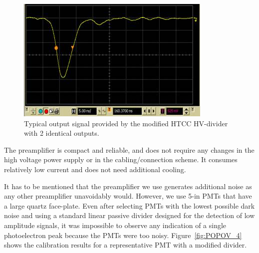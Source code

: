 \begin{figure}[!ht]
    \centering
    \includegraphics[width=1.0\linewidth,trim={0.0cm 0.0cm 0.0cm 0.0cm},clip]{images/POPOV_3.jpg}
    \caption{Typical output signal provided by the modified HTCC HV-divider with 2 identical outputs.}
    \label{fig:POPOV_3}
\end{figure}

The preamplifier is compact and reliable, and does not require any changes in the high voltage power supply or
in the cabling/connection scheme. It consumes relatively low current and does not need additional cooling.
 
It has to be mentioned that the preamplifier we use generates  additional noise as any other preamplifier
unavoidably would. However, we use 5-in PMTs that have a large quartz face-plate. Even after selecting PMTs with
the lowest possible dark noise and using a standard linear passive divider designed for the detection of low
amplitude signals, it was impossible to observe any indication of a single photoelectron peak because the PMTs
were too noisy. Figure~\ref{fig:POPOV_4} shows the calibration results for a representative PMT with a
modified divider.   

